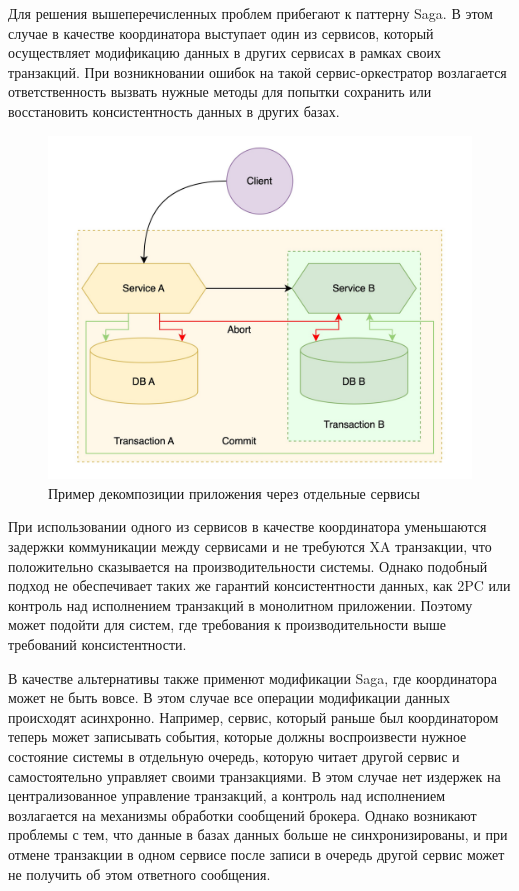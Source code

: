 Для решения вышеперечисленных проблем прибегают к паттерну Saga. В этом случае в качестве координатора
выступает один из сервисов, который осуществляет модификацию данных в других сервисах в рамках своих транзакций.
При возникновании ошибок на такой сервис-оркестратор возлагается ответственность вызвать нужные методы
для попытки сохранить или восстановить консистентность данных в других базах.

\begin{figure}[H]
    \centering
    \includegraphics[width=0.8\linewidth]{img/saga.png}
    \caption{Пример декомпозиции приложения через отдельные сервисы}
    \label{fig:y}
\end{figure}

При использовании одного из сервисов в качестве координатора уменьшаются задержки
коммуникации между сервисами и не требуются XA транзакции, что положительно сказывается на производительности
системы. Однако подобный подход не обеспечивает таких же гарантий консистентности данных, как 2PC или контроль над исполнением
транзакций в монолитном приложении. Поэтому может подойти для систем, где требования к производительности выше требований консистентности.

В качестве альтернативы также применют модификации Saga, где координатора может не быть вовсе. В этом
случае все операции модификации данных происходят асинхронно. Например, сервис, который раньше был координатором теперь может записывать
события, которые должны воспроизвести нужное состояние системы в отдельную очередь, которую читает другой сервис и самостоятельно управляет своими транзакциями.
В этом случае нет издержек на централизованное управление транзакций, а контроль над исполнением возлагается на механизмы обработки сообщений брокера.
Однако возникают проблемы с тем, что данные в базах данных больше не синхронизированы, 
и при отмене транзакции в одном сервисе после записи в очередь другой сервис может не получить об этом ответного сообщения.

